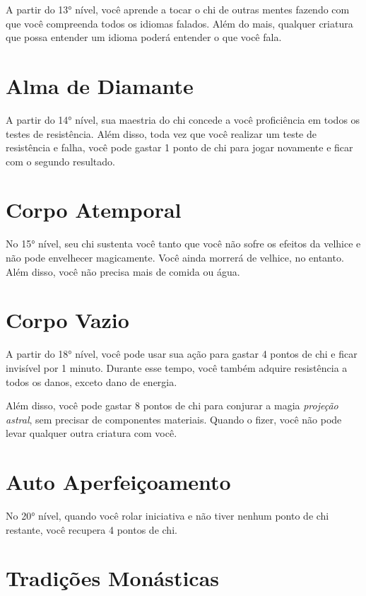 \begin{multicols}{2}
A partir do 13° nível, você aprende a tocar o chi de outras mentes fazendo com
que você compreenda todos os idiomas falados. Além do mais, qualquer criatura
que possa entender um idioma poderá entender o que você fala.

\section*{Alma de Diamante}%
\label{sec:alma_de_diamante}

A partir do 14° nível, sua maestria do chi concede a você proficiência em todos
os testes de resistência. Além disso, toda vez que você realizar um teste de
resistência e falha, você pode gastar 1 ponto de chi para jogar novamente e
ficar com o segundo resultado.

\section*{Corpo Atemporal}%
\label{sec:corpo_atemporal}

No 15° nível, seu chi sustenta você tanto que você não sofre os efeitos da
velhice e não pode envelhecer magicamente. Você ainda morrerá de velhice, no
entanto. Além disso, você não precisa mais de comida ou água.

\section*{Corpo Vazio}%
\label{sec:corpo_vazio}

A partir do 18° nível, você pode usar sua ação para gastar 4 pontos de chi e
ficar invisível por 1 minuto. Durante esse tempo, você também adquire
resistência a todos os danos, exceto dano de energia.

Além disso, você pode gastar 8 pontos de chi para conjurar a magia
\textit{projeção astral}, sem precisar de componentes materiais. Quando o fizer,
você não pode levar qualquer outra criatura com você.

\section*{Auto Aperfeiçoamento}%
\label{sec:auto_aperfeicoamento}

No 20° nível, quando você rolar iniciativa e não tiver nenhum ponto de chi
restante, você recupera 4 pontos de chi.

\section*{Tradições Monásticas}%
\label{sec:tradicoes_monasticas}


\end{multicols}

